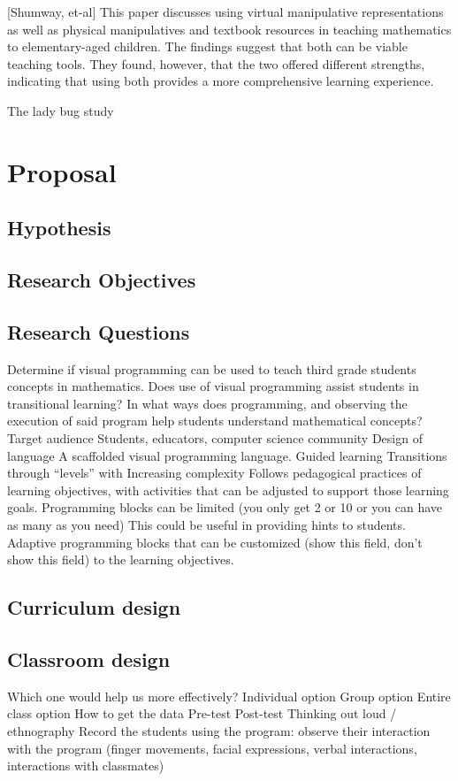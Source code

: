 \documentclass[12pt]{extarticle}
\begin{document}
[Shumway, et-al] This paper discusses using virtual manipulative representations as well as physical manipulatives and textbook resources in teaching mathematics to elementary-aged children. The findings suggest that both can be viable teaching tools. They found, however, that the two offered different strengths, indicating that using both provides a more comprehensive learning experience.

The lady bug study 

\section*{Proposal}
\subsection*{Hypothesis}
\subsection*{Research Objectives}
\subsection*{Research Questions}

Determine if visual programming can be used to teach third grade students concepts in mathematics.
Does use of visual programming assist students in transitional learning?
In what ways does programming, and observing the execution of said program help students understand mathematical concepts?
Target audience
Students, educators, computer science community
Design of language
A scaffolded visual programming language. 
Guided learning
Transitions through “levels” with Increasing complexity
Follows pedagogical practices of learning objectives,  with activities that can be adjusted to support those learning goals. 
Programming blocks can be limited (you only get 2 or 10 or you can have as many as you need) This could be useful in providing hints to students. 
Adaptive programming blocks that can be customized (show this field, don’t show this field) to the learning objectives.

\subsection*{Curriculum design}
\subsection*{Classroom design}
Which one would help us more effectively?
Individual option
Group option
Entire class option
How to get the data
	Pre-test
	Post-test
	Thinking out loud / ethnography
		Record the students using the program: observe their interaction with the program (finger movements, facial expressions, verbal interactions, interactions with classmates)
\end{document}
